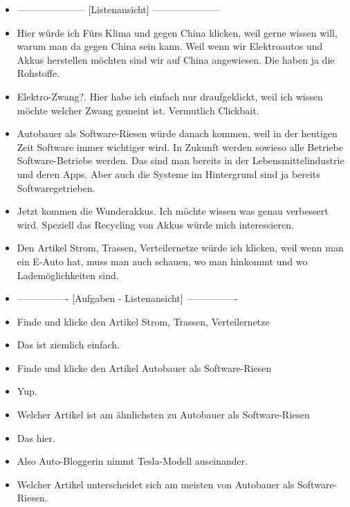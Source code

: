 {\begin{itemize}[]
        \item {---------------------} [Listenansicht] {---------------------}
        \item {} Hier würde ich \flqq Fürs Klima und gegen China\frqq{} klicken, weil gerne wissen will, warum man da gegen China sein kann.
              Weil wenn wir Elektroautos und Akkus herstellen möchten sind wir auf China angewiesen.
              Die haben ja die Rohstoffe.
        \item {} \flqq Elektro-Zwang?\frqq{}.
              Hier habe ich einfach nur draufgeklickt, weil ich wissen möchte welcher Zwang gemeint ist.
              Vermutlich Clickbait.
        \item {} \flqq Autobauer als Software-Riesen\frqq{} würde danach kommen, weil in der heutigen Zeit Software immer wichtiger wird.
              In Zukunft werden sowieso alle Betriebe Software-Betriebe werden.
              Das sind man bereits in der Lebensmittelindustrie und deren Apps.
              Aber auch die Systeme im Hintergrund sind ja bereits Softwaregetrieben.
        \item {} \flqq Jetzt kommen die Wunderakkus\frqq{}.
              Ich möchte wissen was genau verbessert wird.
              Speziell das Recycling von Akkus würde mich interessieren.
        \item {} Den Artikel \flqq Strom, Trassen, Verteilernetze\frqq{} würde ich klicken, weil wenn man ein E-Auto hat, muss man auch schauen, wo man hinkommt und wo Lademöglichkeiten sind.
        \item {----------------} [Aufgaben - Listenansicht] {----------------}
        \item {} Finde und klicke den Artikel \flqq Strom, Trassen, Verteilernetze\frqq{}
        \item {} Das ist ziemlich einfach.
        \item {} Finde und klicke den Artikel \flqq Autobauer als Software-Riesen\frqq{}
        \item {} Yup.
        \item {} Welcher Artikel ist am ähnlichsten zu \flqq Autobauer als Software-Riesen\frqq{}
        \item {} Das hier.
        \item {} Also \flqq Auto-Bloggerin nimmt Tesla-Modell auseinander\frqq{}.
        \item {} Welcher Artikel unterscheidet sich am meisten von \flqq Autobauer als Software-Riesen\frqq{}.

\end{itemize}}
